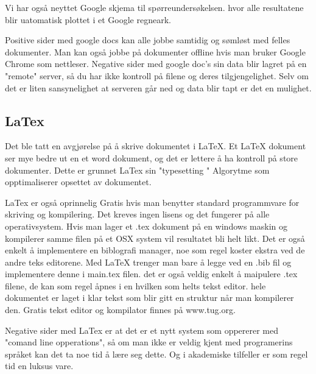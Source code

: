 Vi har også neyttet Google skjema til spørreundersøkelsen. hvor alle resultatene blir uatomatisk plottet i et Google regneark.

\hspace{-17pt}Positive sider med google docs kan alle jobbe samtidig og sømløst med felles dokumenter. Man kan også jobbe på dokumenter offline hvis man bruker Google Chrome som nettleser. Negative sider med google doc's sin data blir lagret på en "remote" server, så du har ikke kontroll på filene og deres tilgjengelighet. Selv om det er liten sansynelighet at serveren går ned og data blir tapt er det en mulighet.\newline


\newpage

\subsection{LaTex}
\vspace{10pt}
Det ble tatt en avgjørelse på å skrive dokumentet i LaTeX. Et LaTeX dokument ser mye bedre ut en et word dokument, og det er lettere å ha kontroll på store dokumenter. Dette er grunnet LaTex sin "typesetting "
Algorytme som opptimaliserer opsettet av dokumentet. \cite {LaTeX}\newline

\hspace{-17pt}LaTex er også oprinnelig Gratis hvis man benytter standard programmvare for skriving og kompilering. Det kreves ingen lisens og det fungerer på alle operativsystem. Hvis man lager et .tex dokument på en windows maskin og kompilerer samme filen på et OSX system vil resultatet bli helt likt.
Det er også enkelt å implementere en biblografi manager, noe som regel koster ekstra ved de andre teks editorene.
Med LaTeX trenger man bare å legge ved en .bib fil og implementere denne i main.tex filen. det er også veldig enkelt å maipulere .tex filene, de kan som regel åpnes i en hvilken som helts tekst editor. hele dokumentet er laget i klar tekst som blir gitt en struktur når man kompilerer den. Gratis tekst editor og kompilator finnes på www.tug.org.\newline

\hspace{-17pt}Negative sider med LaTex er at det er et nytt system som oppererer med "comand line opperations", så om man ikke er veldig kjent med programerins språket kan det ta noe tid å lære seg dette. Og i akademiske tilfeller er som regel tid en luksus vare.\newline

